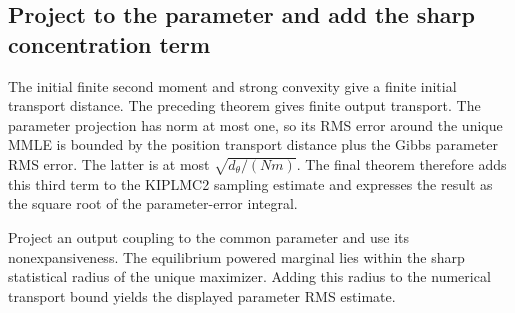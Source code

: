 \documentclass[11pt,a4paper]{report}
\begin{document}
\subsection{\texorpdfstring{Project to the parameter and add the sharp concentration term}{Project to the parameter and add the sharp concentration term}}
\label{report-step-KIPLMC-OBABOBound-lean-5}


The initial finite second moment and strong convexity give a finite initial transport distance. The preceding theorem gives finite output transport. The parameter projection has norm at most one, so its RMS error around the unique MMLE is bounded by the position transport distance plus the Gibbs parameter RMS error. The latter is at most \(\sqrt{d_\theta/(Nm)}\). The final theorem therefore adds this third term to the KIPLMC2 sampling estimate and expresses the result as the square root of the parameter-error integral.



Project an output coupling to the common parameter and use its nonexpansiveness. The equilibrium powered marginal lies within the sharp statistical radius of the unique maximizer. Adding this radius to the numerical transport bound yields the displayed parameter RMS estimate.
\end{document}
